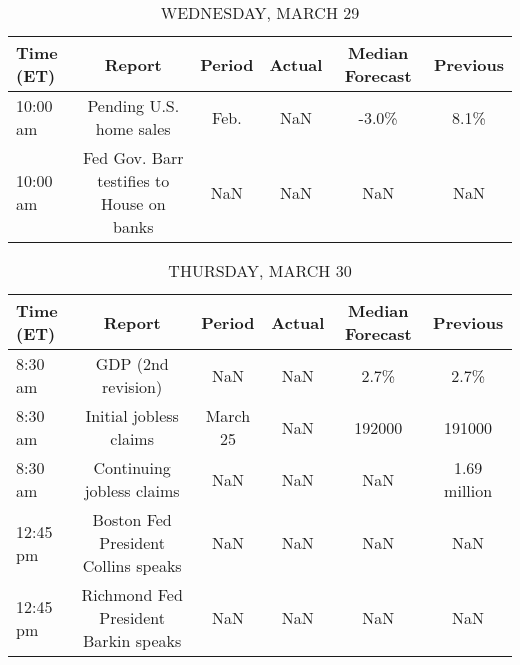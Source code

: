 \documentclass{article}%
\begin{document}
\begin{table}[htbp]%
\caption{WEDNESDAY, MARCH 29}%
\centering%
\begin{adjustbox}{width=1\textwidth}%
\begin{tabular}{lccccc}
\toprule
Time (ET) &                                    Report & Period & Actual & Median Forecast & Previous \\
\midrule
 10:00 am &                   Pending U.S. home sales &   Feb. &    NaN &           -3.0\% &     8.1\% \\
 10:00 am & Fed Gov. Barr testifies to House on banks &    NaN &    NaN &             NaN &      NaN \\
\bottomrule
\end{tabular}
%
\end{adjustbox}%
\end{table}

%


\begin{table}[htbp]%
\caption{THURSDAY, MARCH 30}%
\centering%
\begin{adjustbox}{width=1\textwidth}%
\begin{tabular}{lccccc}
\toprule
Time (ET) &                               Report &   Period & Actual & Median Forecast &     Previous \\
\midrule
  8:30 am &                   GDP (2nd revision) &      NaN &    NaN &            2.7\% &         2.7\% \\
  8:30 am &               Initial jobless claims & March 25 &    NaN &          192000 &       191000 \\
  8:30 am &            Continuing jobless claims &      NaN &    NaN &             NaN & 1.69 million \\
 12:45 pm &  Boston Fed President Collins speaks &      NaN &    NaN &             NaN &          NaN \\
 12:45 pm & Richmond Fed President Barkin speaks &      NaN &    NaN &             NaN &          NaN \\
\bottomrule
\end{tabular}
%
\end{adjustbox}%
\end{table}

%
\end{document}
